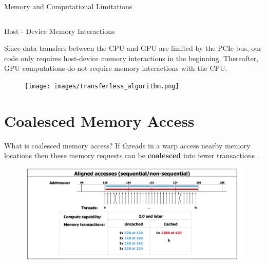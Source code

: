 \documentclass[9pt]{beamer}
\begin{document}
\begin{frame}[t]{Memory and Computational Limitations}
\begin{columns}
\begin{column}{0.5\textwidth}
\begin{center}
\end{center}
\end{column}

\end{columns}
\end{frame}

\begin{frame}[t]{Host - Device Memory Interactions}

Since data transfers between the CPU and GPU are limited by the PCIe bus, our code only requires host-device memory interactions in the beginning. Thereafter, GPU computations do not require memory interactions with the CPU. 

\begin{figure}
\begin{center}
\texttt{[image: images/transferless\_algorithm.png]}
\end{center}
\end{figure}

\end{frame}

\section{Coalesced Memory Access}

\begin{frame}[t]{What is coalesced memory access?}
If threads in a warp access nearby memory locations then these memory requests can be \textbf{coalesced} into fewer transactions \cite{nv_prog_guide}. 

\bigskip 

\begin{figure}
\begin{center}
\includegraphics[scale=0.35]{images/coalesced_memory_aligned.png} %
\end{center}
\end{figure}

\end{frame}
\end{document}
